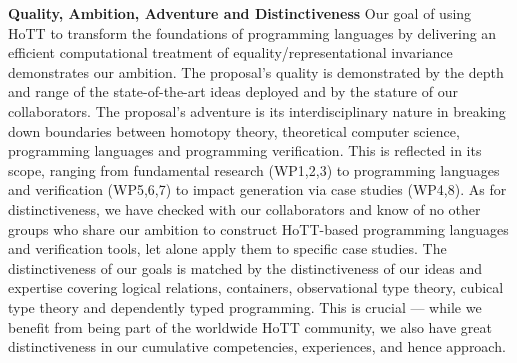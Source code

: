 \documentclass[a4paper,11pt]{article}
\begin{document}
  {\bf Quality, Ambition, Adventure and Distinctiveness} Our goal of
  using HoTT to transform the foundations of programming languages by
  delivering an efficient computational treatment of
  equality/representational invariance demonstrates our ambition. The
  proposal's quality is demonstrated by the depth and range of the
  state-of-the-art ideas deployed and by the stature of our
  collaborators. The proposal's adventure is its interdisciplinary
  nature in breaking down boundaries between homotopy theory, theoretical
  computer science, programming languages and programming
  verification. This is reflected in its scope, ranging from
  fundamental research (WP1,2,3) to programming languages and
  verification (WP5,6,7) to impact generation via case studies
  (WP4,8). As for distinctiveness, we have checked with our
  collaborators and know of no other groups who share our ambition to
  construct HoTT-based programming languages and verification tools,
  let alone apply them to specific case studies. The distinctiveness of our goals is
  matched by the distinctiveness of our ideas and expertise covering
  logical relations, containers, observational type theory, cubical
  type theory and dependently typed programming. This is crucial ---
  while we benefit from being part of the worldwide HoTT community, we
  also have great distinctiveness in our cumulative competencies,
  experiences, and hence approach.

\vspace*{-0.1in} 


\end{document}
